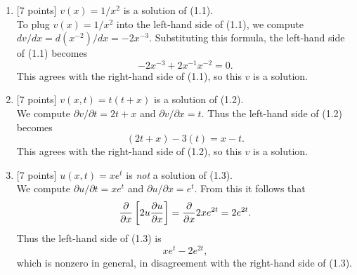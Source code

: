 \begin{solution}
\begin{enumerate}
\item {[7 points]} $v(x) = 1/x^2$ is a solution of (1.1).\\      
      To plug $v(x) = 1/x^2$ into the left-hand side of (1.1), we compute
      $dv/dx = d(x^{-2})/dx = -2x^{-3}$.  Substituting this formula,
      the left-hand side of (1.1) becomes 
           \[ -2x^{-3} + 2x^{-1}x^{-2} = 0.\]
      This agrees with the right-hand side of (1.1), so this $v$ is a solution.
\\
\item {[7 points]} $v(x,t) = t(t+x)$ is a solution of (1.2).\\
      We compute $\partial v/\partial t =  2t+x$ and
                 $\partial v/\partial x = t$.
      Thus the left-hand side of (1.2) becomes
        \[ (2t+x) - 3(t) = x-t.\]
      This agrees with the right-hand side of (1.2), so this $v$ is a solution.
\\
\item {[7 points]} $u(x,t) = x e^t$ is \emph{not} a solution of (1.3).\\
       We compute $\partial u /\partial t = xe^t$ and 
       $\partial u/\partial x = e^t$.
       From this it follows that 
           \[ {\partial\over \partial x} \left[ 2u {\partial u\over \partial x}\right]
                = {\partial \over \partial x} 2xe^{2t} = 2e^{2t}.\]
       Thus the left-hand side of (1.3) is
            \[ xe^t -2e^{2t},\]
       which is nonzero in general, in disagreement with the right-hand side of (1.3).
\end{enumerate}
\end{solution}